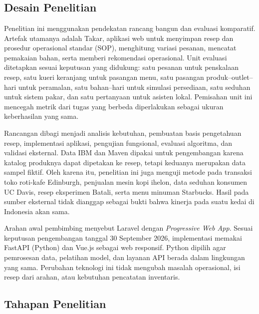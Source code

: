 \chapter{\babTiga}
\label{bab:metode}

\section{Desain Penelitian}
\label{sec:desain-penelitian}

Penelitian ini menggunakan pendekatan rancang bangun dan evaluasi komparatif. Artefak utamanya adalah Takar, aplikasi web untuk menyimpan resep dan prosedur operasional standar (SOP), menghitung variasi pesanan, mencatat pemakaian bahan, serta memberi rekomendasi operasional. Unit evaluasi ditetapkan sesuai keputusan yang didukung: satu pesanan untuk penskalaan resep, satu kueri keranjang untuk pasangan menu, satu pasangan produk--outlet--hari untuk peramalan, satu bahan--hari untuk simulasi persediaan, satu seduhan untuk sistem pakar, dan satu pertanyaan untuk asisten lokal. Pemisahan unit ini mencegah metrik dari tugas yang berbeda diperlakukan sebagai ukuran keberhasilan yang sama.

Rancangan dibagi menjadi analisis kebutuhan, pembuatan basis pengetahuan resep, implementasi aplikasi, pengujian fungsional, evaluasi algoritma, dan validasi eksternal. Data IBM dan Maven dipakai untuk pengembangan karena katalog produknya dapat dipetakan ke resep, tetapi keduanya merupakan data sampel fiktif. Oleh karena itu, penelitian ini juga menguji metode pada transaksi toko roti-kafe Edinburgh, penjualan mesin kopi ihelon, data seduhan konsumen UC Davis, resep eksperimen Batali, serta menu minuman Starbucks. Hasil pada sumber eksternal tidak dianggap sebagai bukti bahwa kinerja pada suatu kedai di Indonesia akan sama.

Arahan awal pembimbing menyebut Laravel dengan \textit{Progressive Web App}. Sesuai keputusan pengembangan tanggal 30 September 2026, implementasi memakai FastAPI (Python) dan Vue.js sebagai web responsif. Python dipilih agar pemrosesan data, pelatihan model, dan layanan API berada dalam lingkungan yang sama. Perubahan teknologi ini tidak mengubah masalah operasional, isi resep dari arahan, atau kebutuhan pencatatan inventaris.

\section{Tahapan Penelitian}
\label{sec:tahapan}

